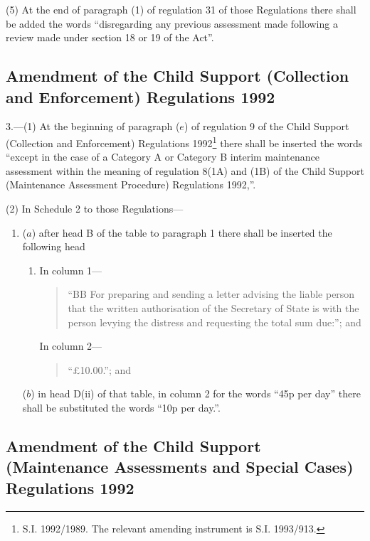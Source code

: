 \documentclass[a4paper]{article}
\begin{document}
(5) At the end of paragraph (1) of regulation 31 of those Regulations there shall be added the words “disregarding any previous assessment made following a review made under section 18 or 19 of the Act”.

\subsection[3. Amendment of the Child Support (Collection and Enforcement) Regulations 1992]{Amendment of the Child Support (Collection and Enforcement) Regulations 1992}

3.—(1) At the beginning of paragraph ($e$) of regulation 9 of the Child Support (Collection and Enforcement) Regulations 1992\footnote{\frenchspacing S.I. 1992/1989. The relevant amending instrument is S.I. 1993/913.} there shall be inserted the words “except in the case of a Category A or Category B interim maintenance assessment within the meaning of regulation 8(1A) and (1B) of the Child Support (Maintenance Assessment Procedure) Regulations 1992,”.

(2) In Schedule 2 to those Regulations—
\begin{enumerate}\item[]
($a$) after head B of the table to paragraph 1 there shall be inserted the following head
\begin{enumerate}\item[]
In column 1—
\begin{quotation}
“BB For preparing and sending a letter advising the liable person that the written authorisation of the Secretary of State is with the person levying the distress and requesting the total sum due:”; and
\end{quotation}

In column 2—
\begin{quotation}
“£10.00.”; and
\end{quotation}
\end{enumerate}

($b$) in head D(ii) of that table, in column 2 for the words “45p per day” there shall be substituted the words “10p per day.”.
\end{enumerate}

\subsection[4. Amendment of the Child Support (Maintenance Assessments and Special Cases) Regulations 1992]{Amendment of the Child Support (Maintenance Assessments and Special Cases) Regulations 1992}
\end{document}
